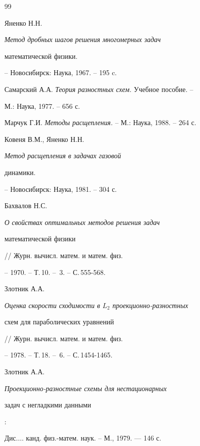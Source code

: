 \begin{thebibliography}{99}







Яненко Н.Н. {\em Метод дробных шагов решения многомерных задач


математической физики.} -- Новосибирск: Наука, 1967. -- 195 c.







Самарский А.А. {\em Теория разностных схем.} Учебное пособие. --


М.: Наука, 1977. -- 656 с.







Марчук Г.И. {\em Методы расщепления.} -- М.: Наука, 1988. -- 264 с.







Ковеня В.М., Яненко Н.Н. {\em Метод расщепления в задачах газовой 


динамики.} -- Новосибирск: Наука, 1981. -- 304 с.







Бахвалов Н.С. {\em О свойствах оптимальных методов решения задач 


математической физики} // Журн. вычисл. матем. и матем. физ.


-- 1970. -- Т.\,10. -- \No\,3. -- С.\,555-568.







Злотник А.А. {\em Оценка скорости сходимости в $L_2$ проекционно-разностных


схем для параболических уравнений} // Журн. вычисл. матем. и матем. физ.


-- 1978. -- Т.\,18. -- \No\,6. -- С.\,1454-1465.







Злотник А.А. {\em Проекционно-разностные схемы для нестационарных


задач с негладкими данными}:


Дис.\;$\dotsc$ канд. физ.-матем. наук. -- М., 1979. --- 146 с.






\end{thebibliography}
